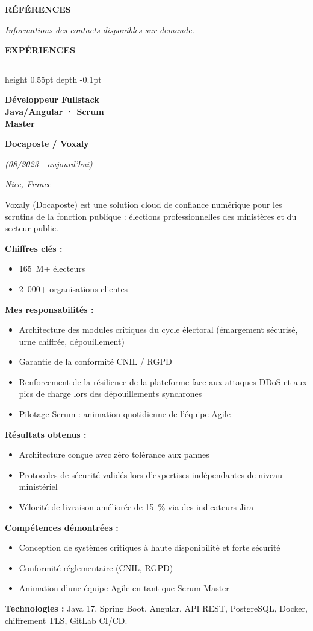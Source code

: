 \documentclass[a4paper,10pt]{article}
\newcommand{\dcsection}[1]{%
  \par\vspace{0.2mm}%
  {\fontsize{16}{19}\selectfont\bfseries\color{dcgold}\MakeUppercase{#1}}\par
  \vspace{2.8mm}%
}
\newcommand{\dcexphdr}{%
  \noindent
  {\fontsize{16}{19}\selectfont\bfseries\color{dcgold}EXPÉRIENCES}%
  \hspace{2.2mm}%
  {\color{dcgold}\leaders\hrule height 0.55pt depth -0.1pt\hfill}\hbox{}%
  \par\vspace{5.5mm}%
}
\newcommand{\dcsub}[1]{%
  \par\vspace{2.1mm}%
  \noindent\textbf{#1}\par
  \vspace{0.4mm}%
}
\newcommand{\dctech}[1]{%
  \par\vspace{2.0mm}%
  \noindent\textbf{Technologies :} #1\par
}
\newlength{\dcleftw}\setlength{\dcleftw}{51.2mm}
\newlength{\dcgap}\setlength{\dcgap}{2.8mm}
\newcommand{\dcexperience}[2]{%
  \par\noindent
  \begin{minipage}[t]{\dcleftw}
    \raggedright #1
  \end{minipage}%
  \hspace{\dcgap}%
  \begin{minipage}[t]{\dimexpr\textwidth-\dcleftw-\dcgap\relax}
    \raggedright\color{dcbody}#2
  \end{minipage}%
  \par
}
\newcommand{\dcjob}[4]{%
  {\fontsize{11.2}{13.4}\selectfont\bfseries\color{dcnavy}#1}\par
  \vspace{0.7mm}%
  {\fontsize{10}{12}\selectfont\bfseries\color{dcnavy}#2}\par
  \vspace{0.9mm}%
  {\fontsize{8.2}{10}\selectfont\itshape\color{dcmuted}(#3)}\par
  \vspace{0.35mm}%
  {\fontsize{7.8}{9.5}\selectfont\itshape\color{dcgoldsoft}#4}\par
}
\newcommand{\dcfooterplain}[1]{%
  \vfill
  \noindent{\fontsize{9}{11}\selectfont\color{dcmuted}#1}%
}
\begin{document}
\vspace{4.2mm}
\dcsection{Références}
{\fontsize{8.4}{10}\selectfont\itshape Informations des contacts disponibles sur demande.}

\dcfooterplain{2}
\clearpage

\fontsize{9}{11.2}\selectfont
\dcexphdr

\dcexperience{%
  \dcjob{Développeur Fullstack\\Java/Angular · Scrum\\Master}%
        {Docaposte / Voxaly}%
        {08/2023 - aujourd'hui}%
        {Nice, France}
}{%
  Voxaly (Docaposte) est une solution cloud de confiance numérique pour les scrutins de
  la fonction publique : élections professionnelles des ministères et du secteur public.

  \dcsub{Chiffres clés :}
  \begin{itemize}
    \item 165~M+ électeurs
    \item 2~000+ organisations clientes
  \end{itemize}

  \dcsub{Mes responsabilités :}
  \begin{itemize}
    \item Architecture des modules critiques du cycle électoral (émargement sécurisé, urne
          chiffrée, dépouillement)
    \item Garantie de la conformité CNIL / RGPD
    \item Renforcement de la résilience de la plateforme face aux attaques DDoS et aux pics de
          charge lors des dépouillements synchrones
    \item Pilotage Scrum : animation quotidienne de l'équipe Agile
  \end{itemize}

  \dcsub{Résultats obtenus :}
  \begin{itemize}
    \item Architecture conçue avec zéro tolérance aux pannes
    \item Protocoles de sécurité validés lors d'expertises indépendantes de niveau ministériel
    \item Vélocité de livraison améliorée de 15~\% via des indicateurs Jira
  \end{itemize}

  \dcsub{Compétences démontrées :}
  \begin{itemize}
    \item Conception de systèmes critiques à haute disponibilité et forte sécurité
    \item Conformité réglementaire (CNIL, RGPD)
    \item Animation d'une équipe Agile en tant que Scrum Master
  \end{itemize}

  \dctech{Java 17, Spring Boot, Angular, API REST, PostgreSQL, Docker, chiffrement TLS, GitLab CI/CD.}
}
\end{document}
